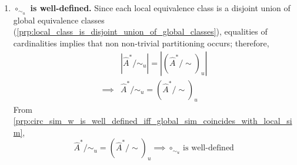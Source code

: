 \begin{proofE}
\begin{enumerate}[(1)]
    \item \textbf{$\circ_{\sim_{u}}$ is well-defined.}
    Since each local equivalence class is a disjoint union of global equivalence classes (\cref{prp:local_class_is_disjoint_union_of_global_classes}), equalities of cardinalities implies that non non-trivial partitioning occurs; therefore,
    \begin{align}
        & |\hat{A}^{*}/\sim_{u}| = |(\hat{A}^{*}/\sim)_{u}| \\
        \implies & \hat{A}^{*}/\sim_{u} = (\hat{A}^{*}/\sim)_{u}
    \end{align}
    From \cref{prp:circ_sim_w_is_well_defined_iff_global_sim_coincides_with_local_sim},
    \begin{equation}
        \hat{A}^{*}/\sim_{u} = (\hat{A}^{*}/\sim)_{u} \implies \text{$\circ_{\sim_{u}}$ is well-defined}
    \end{equation}
\end{enumerate}
\end{proofE}


